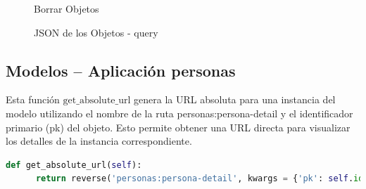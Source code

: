 \documentclass{article}
\begin{document}
  \begin{figure}[H]
    \centering
    \caption{Borrar Objetos}
  \end{figure}
  \begin{figure}[H]
    \centering
    \caption{JSON de los Objetos - query}
  \end{figure}
  

  \subsection{Modelos -- Aplicación personas}
  Esta función $\text{get\_absolute\_url}$ genera la URL absoluta para una instancia del modelo utilizando el nombre de la 
  ruta personas:persona-detail y el identificador primario (pk) del objeto. Esto permite obtener una URL directa 
  para visualizar los detalles de la instancia correspondiente.
  \begin{lstlisting}[language=Python, caption={Modelo Persona}]
    def get_absolute_url(self):
      return reverse('personas:persona-detail', kwargs = {'pk': self.id})
  \end{lstlisting}
    
\end{document}

